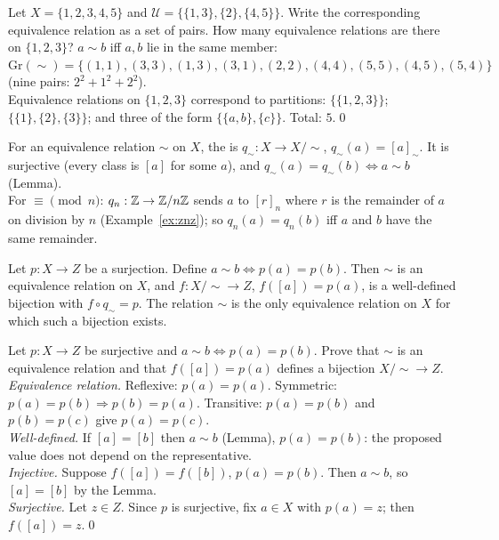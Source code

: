 \begin{hexample}
Let $X=\{1,2,3,4,5\}$ and $\mathcal U=\{\{1,3\},\{2\},\{4,5\}\}$. Write the corresponding equivalence relation as a set of pairs. How many equivalence relations are there on $\{1,2,3\}$?
\solution
$a\sim b$ iff $a,b$ lie in the same member: $\mathrm{Gr}(\sim)=\{(1,1),(3,3),(1,3),(3,1),(2,2),(4,4),(5,5),(4,5),(5,4)\}$ (nine pairs: $2^2+1^2+2^2$).\\
Equivalence relations on $\{1,2,3\}$ correspond to partitions: $\{\{1,2,3\}\}$; $\{\{1\},\{2\},\{3\}\}$; and three of the form $\{\{a,b\},\{c\}\}$. Total: $5$.\qed
\end{hexample}

\begin{key}
For an equivalence relation $\sim$ on $X$, the  is $q_\sim:X\to X/{\sim}$, $q_\sim(a)=[a]_\sim$. It is surjective (every class is $[a]$ for some $a$), and $q_\sim(a)=q_\sim(b)\Leftrightarrow a\sim b$ (Lemma).\\
For $\equiv\pmod n$: $q_n:\mathbb{Z}\to\mathbb{Z}/n\mathbb{Z}$ sends $a$ to $[r]_n$ where $r$ is the remainder of $a$ on division by $n$ (Example~\ref{ex:znz}); so $q_n(a)=q_n(b)$ iff $a$ and $b$ have the same remainder.
\end{key}

\begin{result}
Let $p:X\to Z$ be a surjection. Define $a\sim b\Leftrightarrow p(a)=p(b)$. Then $\sim$ is an equivalence relation on $X$, and $f:X/{\sim}\to Z$, $f([a])=p(a)$, is a well-defined bijection with $f\circ q_\sim=p$. The relation $\sim$ is the only equivalence relation on $X$ for which such a bijection exists.
\end{result}

\begin{hexample}
Let $p:X\to Z$ be surjective and $a\sim b\Leftrightarrow p(a)=p(b)$. Prove that $\sim$ is an equivalence relation and that $f([a])=p(a)$ defines a bijection $X/{\sim}\to Z$.
\solution
\emph{Equivalence relation.} Reflexive: $p(a)=p(a)$. Symmetric: $p(a)=p(b)\Rightarrow p(b)=p(a)$. Transitive: $p(a)=p(b)$ and $p(b)=p(c)$ give $p(a)=p(c)$.\\
\emph{Well-defined.} If $[a]=[b]$ then $a\sim b$ (Lemma), \ie $p(a)=p(b)$: the proposed value does not depend on the representative.\\
\emph{Injective.} Suppose $f([a])=f([b])$, \ie $p(a)=p(b)$. Then $a\sim b$, so $[a]=[b]$ by the Lemma.\\
\emph{Surjective.} Let $z\in Z$. Since $p$ is surjective, fix $a\in X$ with $p(a)=z$; then $f([a])=z$.\qed
\end{hexample}

